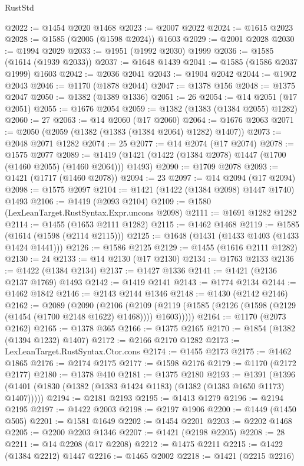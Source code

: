 \begin{lexlean}{RustStd}
\begin{coremodule}
@2022 := @1454 @2020 @1468
@2023 := @2007 @2022
@2024 := @1615 @2023
@2028 := @1585 (@2005 (@1598 @2024)) @1603
@2029 := @2001 @2028
@2030 := @1994 @2029
@2033 := @1951 (@1992 @2030) @1999
@2036 := @1585 (@1614 (@1939 @2033))
@2037 := @1648 @1439
@2041 := @1585 (@1586 @2037 @1999) @1603
@2042 := @2036 @2041
@2043 := @1904 @2042
@2044 := @1902 @2043
@2046 := @1170 (@1878 @2044)
@2047 := @1378 @156
@2048 := @1375 @2047
@2050 := @1382 (@1389 @1336)
@2051 := 26
@2054 := @14 @2051 (@17 @2051)
@2055 := @1676 @2054
@2059 := @1382 (@1383 (@1384 @2055) @1282)
@2060 := 27
@2063 := @14 @2060 (@17 @2060)
@2064 := @1676 @2063
@2071 := @2050 (@2059 (@1382 (@1383 (@1384 @2064) @1282) @1407))
@2073 := @2048 @2071 @1282
@2074 := 25
@2077 := @14 @2074 (@17 @2074)
@2078 := @1575 @2077
@2089 := @1419 (@1421 (@1422 (@1384 @2078) @1447 (@1700 (@1460 @2055) (@1460 @2064))) @1493)
@2090 := @1709 @2078
@2093 := @1421 (@1717 (@1460 @2078))
@2094 := 23
@2097 := @14 @2094 (@17 @2094)
@2098 := @1575 @2097
@2104 := @1421 (@1422 (@1384 @2098) @1447 @1740) @1493
@2106 := @1419 (@2093 @2104)
@2109 := @1580 (LexLeanTarget.RustSyntax.Expr.uncons @2098)
@2111 := @1691 @1282 @1282
@2114 := @1455 (@1653 @2111 @1282)
@2115 := @1462 @1468
@2119 := @1585 (@1614 (@1598 (@2114 @2115)))
@2125 := @1648 (@1431 (@1433 @1403 (@1433 @1424 @1441)))
@2126 := @1586 @2125
@2129 := @1455 (@1616 @2111 @1282)
@2130 := 24
@2133 := @14 @2130 (@17 @2130)
@2134 := @1763 @2133
@2136 := @1422 (@1384 @2134)
@2137 := @1427 @1336
@2141 := @1421 (@2136 @2137 @1769) @1493
@2142 := @1419 @2141
@2143 := @1774 @2134
@2144 := @1462 @1842
@2146 := @2143 @2144 @1346
@2148 := @1430 (@2142 @2146)
@2162 := @2089
    (@2090
      (@2106
        (@2109 (@2119 (@1585 (@2126 (@1598 (@2129 (@1454 (@1700 @2148 @1622) @1468)))) @1603)))))
@2164 := @1170 (@2073 @2162)
@2165 := @1378 @365
@2166 := @1375 @2165
@2170 := @1854 (@1382 (@1394 @1232) @1407)
@2172 := @2166 @2170 @1282
@2173 := LexLeanTarget.RustSyntax.Ctor.cons
@2174 := @1455 @2173
@2175 := @1462 @1865
@2176 := @2174 @2175
@2177 := @1598 @2176
@2179 := @1170 (@2172 @2177)
@2180 := @1378 @410
@2181 := @1375 @2180
@2193 := @1391 (@1396 (@1401 (@1830 (@1382 (@1383 @1424 @1183) (@1382 (@1383 @1650 @1173) @1407)))))
@2194 := @2181 @2193
@2195 := @1413 @1279
@2196 := @2194 @2195
@2197 := @1422 @2003
@2198 := @2197 @1906
@2200 := @1449 (@1450 @505)
@2201 := @1581 @1649
@2202 := @1454 @2201
@2203 := @2202 @1468
@2205 := @2200 @2203 @1346
@2207 := @1421 (@2198 @2205)
@2208 := 28
@2211 := @14 @2208 (@17 @2208)
@2212 := @1475 @2211
@2215 := @1422 (@1384 @2212) @1447
@2216 := @1465 @2002
@2218 := @1421 (@2215 @2216)

\end{coremodule}
\end{lexlean}
